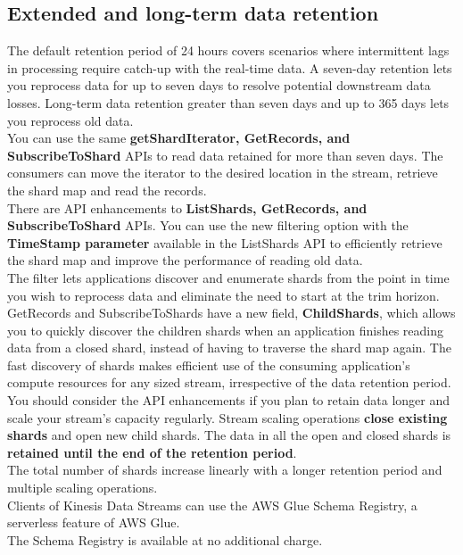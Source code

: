 \documentclass[12pt, letterpaper, twoside]{article}
\begin{document}
\subsection{Extended and long-term data retention}
The default retention period of 24 hours covers scenarios where intermittent lags in processing require catch-up with the real-time data. 
A seven-day retention lets you reprocess data for up to seven days to resolve potential downstream data losses. Long-term data retention greater 
than seven days and up to 365 days lets you reprocess old data.\\

You can use the same \textbf{getShardIterator, GetRecords, and SubscribeToShard} APIs to read data retained for more than seven days. The consumers 
can move the iterator to the desired location in the stream, retrieve the shard map and read the records.\\

There are API enhancements to \textbf{ListShards, GetRecords, and SubscribeToShard} APIs. You can use the new filtering option with 
the \textbf{TimeStamp parameter} available in the ListShards API to efficiently retrieve the shard map and improve the performance of reading 
old data.\\
The filter lets applications discover and enumerate shards from the point in time you wish to reprocess data and eliminate the need to start 
at the trim horizon.\\
GetRecords and SubscribeToShards have a new field, \textbf{ChildShards}, which allows you to quickly discover the children shards when an 
application finishes reading data from a closed shard, instead of having to traverse the shard map again.
The fast discovery of shards makes efficient use of the consuming application’s compute resources for any sized stream, irrespective of the 
data retention period.\\

You should consider the API enhancements if you plan to retain data longer and scale your stream’s capacity regularly. Stream scaling operations 
\textbf{close existing shards} and open new child shards. The data in all the open and closed shards is \textbf{retained until the end of the 
retention period}.\\
The total number of shards increase linearly with a longer retention period and multiple scaling operations.\\

Clients of Kinesis Data Streams can use the AWS Glue Schema Registry, a serverless feature of AWS Glue.\\
The Schema Registry is available at no additional charge.\\
\end{document}
